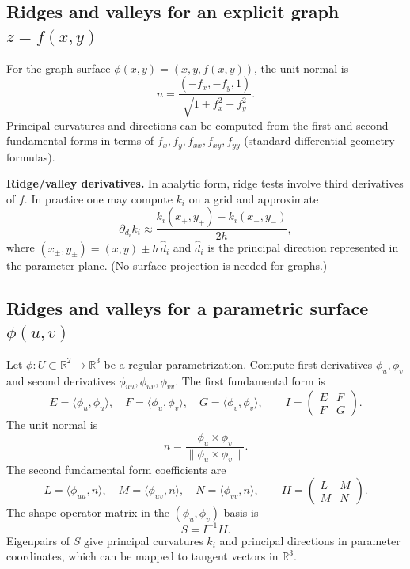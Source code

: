 \documentclass[12pt,a4paper]{article}
\theoremstyle{plain}
\theoremstyle{definition}      %
\begin{document}
\subsection*{Ridges and valleys for an explicit graph $z=f(x,y)$}

For the graph surface $\phi(x,y)=(x,y,f(x,y))$, the unit normal is
\[
n=\frac{(-f_x,-f_y,1)}{\sqrt{1+f_x^2+f_y^2}}.
\]
Principal curvatures and directions can be computed from the first and second fundamental forms in terms of
$f_x,f_y,f_{xx},f_{xy},f_{yy}$ (standard differential geometry formulas).

\medskip
\noindent
\textbf{Ridge/valley derivatives.}
In analytic form, ridge tests involve third derivatives of $f$.
In practice one may compute $k_i$ on a grid and approximate
\[
\partial_{d_i}k_i \approx \frac{k_i(x_+,y_+)-k_i(x_-,y_-)}{2h},
\]
where $(x_\pm,y_\pm)=(x,y)\pm h\,\hat d_i$ and $\hat d_i$ is the principal direction represented in the parameter
plane. (No surface projection is needed for graphs.)

\subsection*{Ridges and valleys for a parametric surface $\phi(u,v)$}

Let $\phi:U\subset\mathbb{R}^2\to\mathbb{R}^3$ be a regular parametrization.
Compute first derivatives $\phi_u,\phi_v$ and second derivatives $\phi_{uu},\phi_{uv},\phi_{vv}$.
The first fundamental form is
\[
E=\langle\phi_u,\phi_u\rangle,\quad
F=\langle\phi_u,\phi_v\rangle,\quad
G=\langle\phi_v,\phi_v\rangle,
\qquad
I=\begin{pmatrix}E&F\\F&G\end{pmatrix}.
\]
The unit normal is
\[
n=\frac{\phi_u\times\phi_v}{\|\phi_u\times\phi_v\|}.
\]
The second fundamental form coefficients are
\[
L=\langle\phi_{uu},n\rangle,\quad
M=\langle\phi_{uv},n\rangle,\quad
N=\langle\phi_{vv},n\rangle,
\qquad
II=\begin{pmatrix}L&M\\M&N\end{pmatrix}.
\]
The shape operator matrix in the $(\phi_u,\phi_v)$ basis is
\[
S = I^{-1}II.
\]
Eigenpairs of $S$ give principal curvatures $k_i$ and principal directions in parameter coordinates,
which can be mapped to tangent vectors in $\mathbb{R}^3$.
\end{document}
